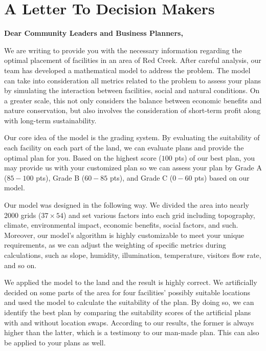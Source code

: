 \documentclass[./main.tex]{subfiles}
\begin{document}
    \section*{A Letter To Decision Makers}
    \textbf{Dear Community Leaders and Business Planners,}

    \vspace{1.5ex}

    We are writing to provide you with the necessary information regarding the optimal placement of facilities in an area of Red Creek.
    After careful analysis, our team has developed a mathematical model to address the problem.
    The model can take into consideration all metrics related to the problem to assess your plans by simulating the
    interaction between facilities, social and natural conditions.
    On a greater scale, this not only considers the balance between economic benefits and nature conservation, but also involves the consideration of short-term profit along with long-term sustainability.

    Our core idea of the model is the grading system.
    By evaluating the suitability of each facility on each part of the land, we can evaluate plans and provide the optimal plan for you.
    Based on the highest score ($100$ pts) of our best plan, you may provide us with your customized plan so we can assess your plan by Grade A ($85-100$ pts), Grade B ($60-85$ pts), and Grade C ($0-60$ pts) based on our model.

    Our model was designed in the following way.
    We divided the area into nearly 2000 grids ($37\times 54$) and set various factors into each grid including topography, climate, environmental impact, economic benefits, social factors, and such.
    Moreover, our model's algorithm is highly customizable to meet your unique requirements, as we can adjust the
    weighting of specific metrics during calculations, such as slope, humidity, illumination, temperature, visitors
    flow rate, and so on.

    We applied the model to the land and the result is highly correct.
    We artificially decided on some parts of the area for four facilities' possibly suitable locations and used the
    model to calculate the suitability of the plan.
    By doing so, we can identify the best plan by comparing the suitability scores of the artificial plans with and without location swaps.
    According to our results, the former is always higher than the latter, which is a testimony to our man-made plan.
    This can also be applied to your plans as well.
\end{document}
